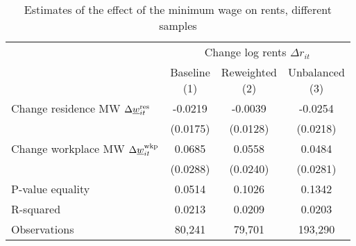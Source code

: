 \begin{table}[hbt!]
    \centering
    \caption{Estimates of the effect of the minimum wage on rents, different samples}
    \label{tab:static_sample}

    \begin{tabular}{@{}lccc@{}}
        \toprule
                                             & \multicolumn{3}{c}{Change log rents $\Delta r_{it}$}            \\ \cmidrule(l){2-4} 
                                             & \shortstack{Baseline\\(1)}       & \shortstack{Reweighted\\(2)} 
                                             & \shortstack{Unbalanced\\(3)}                                    \\ \midrule
        Change residence MW 
                  $\Delta\underline{w}_{it}^{\text{res}}$    & -0.0219      & -0.0039        & -0.0254         \\
                                             & (0.0175)    & (0.0128)      & (0.0218)       \\
        Change workplace MW 
                   $\Delta\underline{w}_{it}^{\text{wkp}}$   & 0.0685      & 0.0558        & 0.0484         \\
                                             & (0.0288)    & (0.0240)      & (0.0281)       \\ \midrule
        P-value equality                     & 0.0514      & 0.1026        & 0.1342         \\
        R-squared                            & 0.0213      & 0.0209        & 0.0203         \\
        Observations                         & 80,241     & 79,701       & 193,290        \\ \bottomrule
    \end{tabular}


\end{table}
